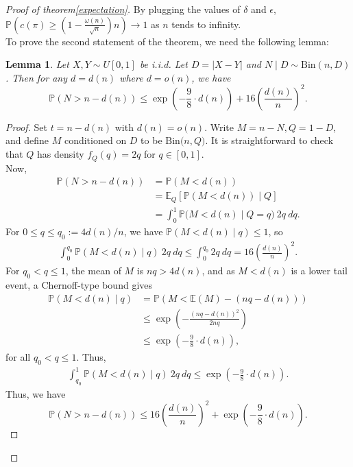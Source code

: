 \documentclass[10pt,a4paper]{amsart}
\newtheorem{lemma}{Lemma}
\begin{document}
\begin{proof}[Proof of theorem\ref{expectation}]
 By plugging the values of $\delta$ and $ \epsilon $, $\mathbb{P}\left( c(\pi) \geq \left( 1- \frac{\omega(n)}{\sqrt{n}} \right)n \right) \longrightarrow 1 $ as $n$ tends to infinity. \\
 To prove the second statement of the theorem, we need the following lemma:
\begin{lemma}\label{lemma 4.2}
   Let \(X,Y\sim U[0,1]\) be i.i.d. Let \(D = |X-Y|\) and \(N\mid D \sim \text{Bin}(n,D)\). Then for any $d = d(n)$ where $d=o(n)$, we have
   $$ \mathbb{P}(N>n-d(n)) \leq \exp{\left(-\frac{9}{8}\cdot d(n)\right)} + 16\left(\frac{d(n)}{n}\right)^2.$$
\end{lemma}
\begin{proof}
Set $t = n - d(n)$ with $d(n) = o(n)$. Write $M = n-N, Q= 1-D$, and define $M$ conditioned on $D$ to be  $\text{Bin}\big(n,Q\big)$. It is straightforward to check that $Q$ has  density $f_Q(q) = 2q$ for $q \in [0, 1]$.\\
Now,
\begin{align*}
    \mathbb{P}(N>n-d(n)) & = \mathbb{P}\left( M < d(n) \right) \\
   &= \mathbb{E}_Q\left[ \mathbb{P}(M<d(n) ) \mid Q\right] \\
   & = \int_0^1 \mathbb{P}\big(M<d(n)\mid Q=q\big)\ 2q\ dq.
\end{align*}
 For $0\le q\le q_0:=4d(n)/n$, we have $\mathbb{P}(M<d(n)\mid q)\le 1$, so
    \begin{align}\label{eq:9}
        \int_0^{q_0} \mathbb{P}(M<d(n)\mid q)\ 2q\  dq
    \le \int_0^{q_0} 2q\ dq
    = 16\left(\frac{d(n)}{n}\right)^2.
    \end{align}
    For $q_0 < q \leq 1$, the mean of $M$ is $nq > 4d(n)$, and as $M<d(n)$ is a lower tail event, a Chernoff-type bound gives 
    \begin{align*}
         \mathbb{P}(M<d(n)\mid q) & = \mathbb{P}\left(  M < \mathbb{E}(M)  -(nq - d(n))\right) \\
        & \leq \exp{\left( -\frac{(nq - d(n))^2}{2nq} \right)} \\
       & \leq \exp{\left( -\frac{9}{8}\cdot d(n) \right)},
    \end{align*}
    for all $q_0 < q \leq 1$. Thus,
    \begin{align}
        \int_{q_0}^1 \mathbb{P}(M<d(n)\mid q)\ 2q\  dq \le \exp\left(-\frac{9}{8}\cdot d(n)\right).
    \end{align}
Thus, we have 
$$
\mathbb{P}(N>n-d(n)) \leq 16\left(\frac{d(n)}{n}\right)^2 + \exp\left(-\frac{9}{8}\cdot d(n)\right).
$$
\end{proof}
\end{proof}
\end{document}
